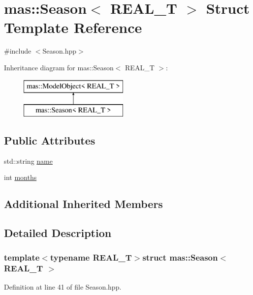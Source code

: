 \hypertarget{structmas_1_1_season}{\section{mas\-:\-:Season$<$ R\-E\-A\-L\-\_\-\-T $>$ Struct Template Reference}
\label{structmas_1_1_season}
}


{\ttfamily \#include $<$Season.\-hpp$>$}

Inheritance diagram for mas\-:\-:Season$<$ R\-E\-A\-L\-\_\-\-T $>$\-:\begin{figure}[H]
\begin{center}
\leavevmode
\includegraphics[height=2.000000cm]{structmas_1_1_season}
\end{center}
\end{figure}
\subsection*{Public Attributes}
\begin{DoxyCompactItemize}
\item 
std\-::string \hyperlink{structmas_1_1_season_a04a3d17eb36c71f3f5474468d2d73605}{name}
\item 
int \hyperlink{structmas_1_1_season_aad51659a30850ce9ee579e625ec0a212}{months}
\end{DoxyCompactItemize}
\subsection*{Additional Inherited Members}


\subsection{Detailed Description}
\subsubsection*{template$<$typename R\-E\-A\-L\-\_\-\-T$>$struct mas\-::\-Season$<$ R\-E\-A\-L\-\_\-\-T $>$}



Definition at line 41 of file Season.\-hpp.




